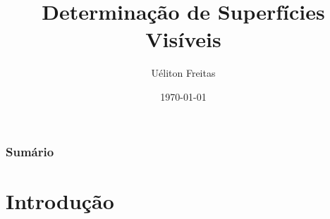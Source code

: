 \documentclass{beamer}
\title[Computação Gráfica]{Determinação de Superfícies Visíveis} %
\author{Uéliton Freitas} %
\institute[UFMS] %
{
Universidade Católica Dom Bosco - UCDB \\ %
\medskip
\textit{freitas.ueliton@gmail.com} %
}
\date{\today} %
\begin{document}
\begin{frame}
\titlepage %
\end{frame}

\begin{frame}
\frametitle{Sumário} %
\tableofcontents %
\end{frame}





\section{Introdução} 

\end{document}
